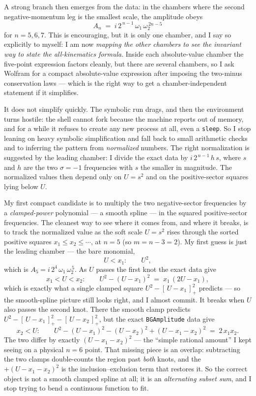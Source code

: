 \documentclass{article}
\newcommand{\pp}[1]{\left[\,#1\,\right]_{+}}
\begin{document}
A strong branch then emerges from the data: in the chambers where the
second negative-momentum leg is the smallest scale, the amplitude obeys
\[
A_n \;=\; i\,2^{\,n-1}\,\omega_1\,\omega_2^{\,2n-5}
\]
for $n=5,6,7$. This is encouraging, but it is only one chamber, and I say so
explicitly to myself: I am now \emph{mapping the other chambers to see the
invariant way to state the all-kinematics formula}. Inside each absolute-value
chamber the five-point expression factors cleanly, but there are several
chambers, so I ask Wolfram for a compact absolute-value expression after imposing
the two-minus conservation laws --- which is the right way to get a
chamber-independent statement if it simplifies.

It does not simplify quickly. The symbolic run drags, and then the environment
turns hostile: the shell cannot fork because the machine reports out of memory,
and for a while it refuses to create any new process at all, even a
\texttt{sleep}. So I stop leaning on heavy symbolic simplification and fall back
to small arithmetic checks and to inferring the pattern from \emph{normalized}
numbers. The right normalization is suggested by the leading chamber: I divide
the exact data by $i\,2^{\,n-1}\,h\,s$, where $s$ and $h$ are the two $\sigma=-1$
frequencies with $s$ the smaller in magnitude. The normalized values then depend
only on $U=s^2$ and on the positive-sector squares lying below $U$.

My first compact candidate is to multiply the two negative-sector frequencies by
a \emph{clamped-power} polynomial --- a smooth spline --- in the squared
positive-sector frequencies. The cleanest way to see where it comes from, and
where it breaks, is to track the normalized value as the soft scale $U=s^2$ rises
through the sorted positive squares $x_1\le x_2\le\cdots$, at $n=5$ (so
$m=n-3=2$). My first guess is just the leading chamber --- the bare monomial,
\[
U<x_1:\qquad U^{2},
\]
which is $A_5=i\,2^{4}\,\omega_1\,\omega_2^{\,5}$. As $U$ passes the first knot the
exact data give
\[
x_1<U<x_2:\qquad U^2-(U-x_1)^2 \;=\; x_1\,(2U-x_1),
\]
which is exactly what a single clamped square $U^2-\pp{U-x_1}^2$ predicts --- so
the smooth-spline picture still looks right, and I almost commit. It breaks when
$U$ also passes the second knot. There the smooth clamp predicts
$U^2-\pp{U-x_1}^2-\pp{U-x_2}^2$, but the exact \texttt{BGAmplitude} data give
\[
x_2<U:\qquad U^2-(U-x_1)^2-(U-x_2)^2+(U-x_1-x_2)^2 \;=\; 2\,x_1 x_2 .
\]
The two differ by exactly $(U-x_1-x_2)^2$ --- the ``simple rational amount'' I
kept seeing on a physical $n=6$ point. That missing piece is an overlap:
subtracting the two clamps double-counts the region past \emph{both} knots, and
the $+(U-x_1-x_2)^2$ is the inclusion--exclusion term that restores it. So the
correct object is not a smooth clamped spline at all; it is an \emph{alternating
subset sum}, and I stop trying to bend a continuous function to fit.
\end{document}
